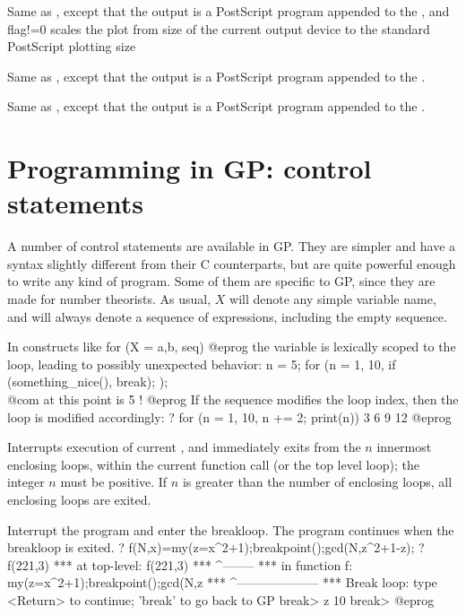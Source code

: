 \label{se:psdraw}
Same as , except that the output is a PostScript program
appended to the , and flag!=0 scales the plot from size of the
current output device to the standard PostScript plotting size

\label{se:psploth}
Same as , except that the output is a PostScript program
appended to the .

\label{se:psplothraw}
Same as , except that the output is a PostScript program
appended to the .

\section{Programming in GP: control statements}
\label{se:programming}

  A number of control statements are available in GP. They are simpler and
have a syntax slightly different from their C counterparts, but are quite
powerful enough to write any kind of program. Some of them are specific to
GP, since they are made for number theorists. As usual, $X$ will denote any
simple variable name, and  will always denote a sequence of
expressions, including the empty sequence.

 In constructs like
\bprog
    for (X = a,b, seq)
@eprog\noindent
the variable  is lexically scoped to the loop, leading to possibly
unexpected behavior:
\bprog
    n = 5;
    for (n = 1, 10,
      if (something_nice(), break);
    );
    \\ @com at this point  is 5 !
@eprog\noindent
If the sequence  modifies the loop index, then the loop
is modified accordingly:
\bprog
    ? for (n = 1, 10, n += 2; print(n))
    3
    6
    9
    12
@eprog


\label{se:break}
Interrupts execution of current , and
immediately exits from the $n$ innermost enclosing loops, within the
current function call (or the top level loop); the integer $n$ must be
positive. If $n$ is greater than the number of enclosing loops, all
enclosing loops are exited.

\label{se:breakpoint}
Interrupt the program and enter the breakloop. The program continues when
the breakloop is exited.
\bprog
? f(N,x)=my(z=x^2+1);breakpoint();gcd(N,z^2+1-z);
? f(221,3)
  ***   at top-level: f(221,3)
  ***                 ^--------
  ***   in function f: my(z=x^2+1);breakpoint();gcd(N,z
  ***                              ^--------------------
  ***   Break loop: type <Return> to continue; 'break' to go back to GP
break> z
10
break>
@eprog

